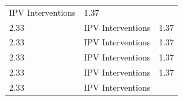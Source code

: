 \documentclass[]{tufte-handout}
\begin{document}
\begin{longtable}[]{@{}lll@{}}
\begin{minipage}[t]{0.27\columnwidth}
IPV Interventions\strut
\end{minipage} & \begin{minipage}[t]{0.08\columnwidth}\raggedright\strut
1.37\strut
\end{minipage}\tabularnewline
\begin{minipage}[t]{0.09\columnwidth}\raggedright\strut
2.33\strut
\end{minipage} & \begin{minipage}[t]{0.27\columnwidth}\raggedright\strut
IPV Interventions\strut
\end{minipage} & \begin{minipage}[t]{0.08\columnwidth}\raggedright\strut
1.37\strut
\end{minipage}\tabularnewline
\begin{minipage}[t]{0.09\columnwidth}\raggedright\strut
2.33\strut
\end{minipage} & \begin{minipage}[t]{0.27\columnwidth}\raggedright\strut
IPV Interventions\strut
\end{minipage} & \begin{minipage}[t]{0.08\columnwidth}\raggedright\strut
1.37\strut
\end{minipage}\tabularnewline
\begin{minipage}[t]{0.09\columnwidth}\raggedright\strut
2.33\strut
\end{minipage} & \begin{minipage}[t]{0.27\columnwidth}\raggedright\strut
IPV Interventions\strut
\end{minipage} & \begin{minipage}[t]{0.08\columnwidth}\raggedright\strut
1.37\strut
\end{minipage}\tabularnewline
\begin{minipage}[t]{0.09\columnwidth}\raggedright\strut
2.33\strut
\end{minipage} & \begin{minipage}[t]{0.27\columnwidth}\raggedright\strut
IPV Interventions\strut
\end{minipage} & \begin{minipage}[t]{0.08\columnwidth}\raggedright\strut
1.37\strut
\end{minipage}\tabularnewline
\begin{minipage}[t]{0.09\columnwidth}\raggedright\strut
2.33\strut
\end{minipage} & \begin{minipage}[t]{0.27\columnwidth}\raggedright\strut
IPV Interventions\strut

\end{minipage}
\end{longtable}
\end{document}
